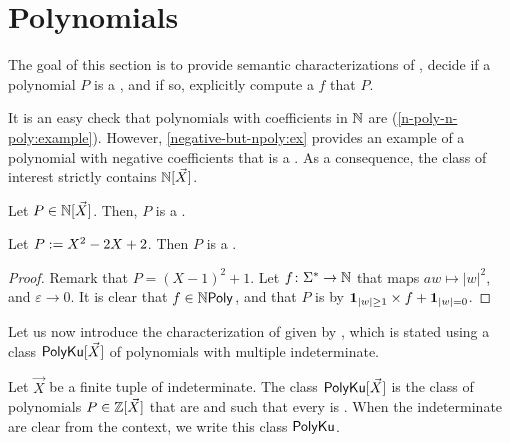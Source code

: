 \section{Polynomials}
\label{polynomials:sec}

The goal of this section is to provide semantic characterizations of
, decide if a polynomial $P$ is a
, and if so, explicitly compute a
 $f$ that  $P$.

It is an easy check that polynomials with coefficients in $\mathbb{N}$ are
 (\cref{n-poly-n-poly:example}). However,
\cref{negative-but-npoly:ex} provides an example of a polynomial with negative
coefficients that is a . As a consequence, the
class of interest strictly contains $\mathbb{N}[\vec{X}]$.

\begin{fact}
    \label{n-poly-n-poly:example}
    Let $P \in \mathbb{N}[\vec{X}]$. Then, $P$
    is a .
\end{fact}

\begin{example}
    \label{negative-but-npoly:ex}
    Let $P \mathrel{:=} X^2 -2X + 2$. Then $P$
    is a .
\end{example}
\begin{proof}
    Remark that $P = (X-1)^2 + 1$. Let $f  \colon \Sigma^* \to \mathbb{N}$
    that maps $aw \mapsto |w|^2$, and $\varepsilon \to 0$.
    It is clear that $f \in \NPoly$, and that 
    $P$ is  by
    $\mathbf{1}_{|w| \geq 1} \times f + \mathbf{1}_{|w| = 0}$.
\end{proof}

Let us now introduce the characterization of 
given by \citeauthor{KARH77}, which is stated using a class
$\mathsf{PolyKu}[\vec{X}]$ of polynomials with multiple indeterminate.

\begin{definition}
    Let $\vec{X}$ be a finite tuple of indeterminate.
    The class $\mathsf{PolyKu}[\vec{X}]$
    is the class of polynomials $P \in \mathbb{Z}[\vec{X}]$
    that are 
    and such that every  is .
    When the indeterminate are clear from the context, we write
    this class $\mathsf{PolyKu}$.
\end{definition}

